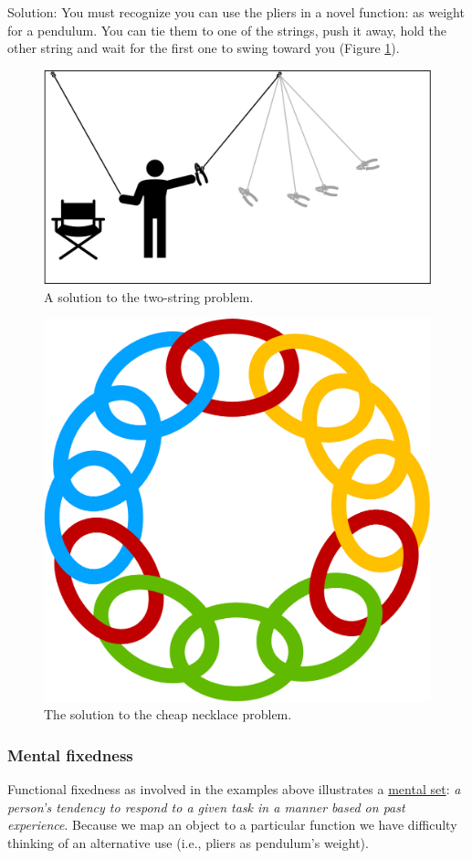 \documentclass[
]{krantz}
\begin{document}
Solution: You must recognize you can use the pliers in a novel function: as weight for a pendulum. You can tie them to one of the strings, push it away, hold the other string and wait for the first one to swing toward you (Figure \ref{fig:twostring2}).

\begin{figure}

{\centering \includegraphics[width=0.6\linewidth]{images/ch10/twostring2} 

}

\caption{A solution to the two-string problem.}\label{fig:twostring2}
\end{figure}

\begin{figure}

{\centering \includegraphics[width=0.5\linewidth]{images/ch10/chain2} 

}

\caption{The solution to the cheap necklace problem.}\label{fig:chain2}
\end{figure}

\subsubsection*{Mental fixedness}\label{mental-fixedness}


Functional fixedness as involved in the examples above illustrates a \hyperref[mental-set]{mental set}: \emph{a person's tendency to respond to a given task in a manner based on past experience}. Because we map an object to a particular function we have difficulty thinking of an alternative use (i.e., pliers as pendulum's weight).
\end{document}
